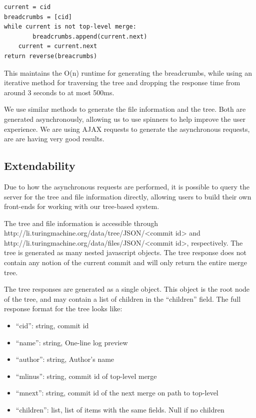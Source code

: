 \documentclass[conference, draftclsnofoot]{IEEEtran}
\begin{document}
\begin{verbatim}
current = cid
breadcrumbs = [cid]
while current is not top-level merge:
        breadcrumbs.append(current.next)
	current = current.next
return reverse(breacrumbs)
\end{verbatim}

This maintains the O(n) runtime for generating the breadcrumbs, while using an
iterative method for traversing the tree and dropping the response time from
around 3 seconds to at most 500ms.

We use similar methods to generate the file information and the tree. Both are
generated asynchronously, allowing us to use spinners to help improve the user
experience. We are using AJAX requests to generate the asynchronous requests,
are are having very good results.

\subsection{Extendability}
Due to how the asynchronous requests are performed, it is possible to query the
server for the tree and file information directly, allowing users to build
their own front-ends for working with our tree-based system.

The tree and file information is accessible through
http://li.turingmachine.org/data/tree/JSON/<commit id> and
http://li.turingmachine.org/data/files/JSON/<commit id>, respectively.
The tree is generated as many nested javascript objects. The tree response does
not contain any notion of the current commit and will only return the entire
merge tree.

The tree responses are generated as a single object. This object is the root
node of the tree, and may contain a list of children in the ``children'' field.
The full response format for the tree looks like:

\begin{itemize}
        \item ``cid'': string, commit id
        \item ``name'': string, One-line log preview
        \item ``author'': string, Author's name
        \item ``mlinus'': string, commit id of top-level merge
        \item ``mnext'': string, commit id of the next merge on path to
                top-level
        \item ``children'': list, list of items with the same fields. Null if
                no children
\end{itemize}
\end{document}
